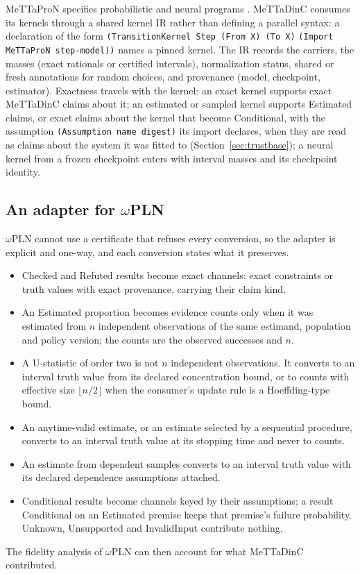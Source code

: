 \documentclass[11pt]{article}
\newcommand{\code}[1]{\texttt{#1}}
\theoremstyle{definition}
\theoremstyle{plain}
\begin{document}
MeTTaProN specifies probabilistic and neural programs \cite{mettapron}. MeTTaDinC consumes its kernels
through a shared kernel IR rather than defining a parallel syntax: a declaration of the form
\code{(TransitionKernel Step (From X) (To X)} \code{(Import MeTTaProN step-model))} names a pinned
kernel.
The IR records the carriers, the masses (exact rationals or certified intervals), normalization
status, shared or fresh annotations for random choices, and provenance (model, checkpoint,
estimator). Exactness travels with the kernel: an exact kernel supports exact MeTTaDinC claims about
it; an estimated or sampled kernel supports Estimated claims, or exact claims about the kernel that
become Conditional, with the assumption \code{(Assumption name digest)} its import declares, when
they are read as claims about the system it was fitted to (Section~\ref{sec:trustbase}); a neural
kernel from a frozen checkpoint enters with interval masses and its checkpoint identity.

\subsection{An adapter for \texorpdfstring{$\omega$PLN}{omegaPLN}}\label{sec:pln}

$\omega$PLN cannot use a certificate that refuses every conversion, so the adapter is explicit and
one-way, and each conversion states what it preserves.
\begin{itemize}
\item Checked and Refuted results become exact channels: exact constraints or truth values with
exact provenance, carrying their claim kind.
\item An Estimated proportion becomes evidence counts only when it was estimated from $n$
independent observations of the same estimand, population and policy version; the counts are the
observed successes and $n$.
\item A U-statistic of order two is not $n$ independent observations. It converts to an interval
truth value from its declared concentration bound, or to counts with effective size $\lfloor
n/2\rfloor$ when the consumer's update rule is a Hoeffding-type bound.
\item An anytime-valid estimate, or an estimate selected by a sequential procedure, converts to an
interval truth value at its stopping time and never to counts.
\item An estimate from dependent samples converts to an interval truth value with its declared
dependence assumptions attached.
\item Conditional results become channels keyed by their assumptions; a result Conditional on an
Estimated premise keeps that premise's failure probability. Unknown, Unsupported and InvalidInput
contribute nothing.
\end{itemize}
The fidelity analysis of $\omega$PLN \cite{pab} can then account for what MeTTaDinC contributed.
\end{document}
